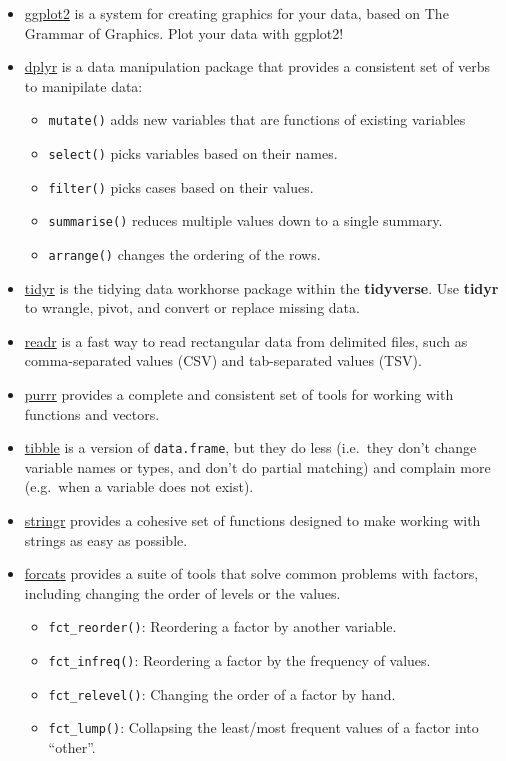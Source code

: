 \documentclass[
]{book}
\providecommand{\tightlist}{%
  \setlength{\itemsep}{0pt}\setlength{\parskip}{0pt}}
\begin{document}
\begin{itemize}
\tightlist
\item
  \href{https://ggplot2.tidyverse.org/}{ggplot2} is a system for creating graphics for your data, based on The Grammar of Graphics. Plot your data with ggplot2!
\item
  \href{https://dplyr.tidyverse.org/}{dplyr} is a data manipulation package that provides a consistent set of verbs to manipilate data:

  \begin{itemize}
  \tightlist
  \item
    \texttt{mutate()} adds new variables that are functions of existing variables
  \item
    \texttt{select()} picks variables based on their names.
  \item
    \texttt{filter()} picks cases based on their values.
  \item
    \texttt{summarise()} reduces multiple values down to a single summary.
  \item
    \texttt{arrange()} changes the ordering of the rows.
  \end{itemize}
\item
  \href{https://tidyr.tidyverse.org/}{tidyr} is the tidying data workhorse package within the \textbf{tidyverse}. Use \textbf{tidyr} to wrangle, pivot, and convert or replace missing data.
\item
  \href{https://readr.tidyverse.org/}{readr} is a fast way to read rectangular data from delimited files, such as comma-separated values (CSV) and tab-separated values (TSV).
\item
  \href{https://purrr.tidyverse.org/}{purrr} provides a complete and consistent set of tools for working with functions and vectors.
\item
  \href{https://tibble.tidyverse.org/}{tibble} is a version of \texttt{data.frame}, but they do less (i.e.~they don't change variable names or types, and don't do partial matching) and complain more (e.g.~when a variable does not exist).
\item
  \href{https://stringr.tidyverse.org/}{stringr} provides a cohesive set of functions designed to make working with strings as easy as possible.
\item
  \href{https://forcats.tidyverse.org/}{forcats} provides a suite of tools that solve common problems with factors, including changing the order of levels or the values.

  \begin{itemize}
  \tightlist
  \item
    \texttt{fct\_reorder()}: Reordering a factor by another variable.
  \item
    \texttt{fct\_infreq()}: Reordering a factor by the frequency of values.
  \item
    \texttt{fct\_relevel()}: Changing the order of a factor by hand.
  \item
    \texttt{fct\_lump()}: Collapsing the least/most frequent values of a factor into ``other''.
  \end{itemize}
\end{itemize}
\end{document}
